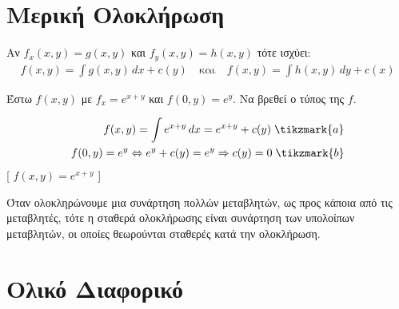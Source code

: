 
\section{Μερική Ολοκλήρωση}

\begin{rem}
\item {}
  Αν $ f_{x}(x,y) = g(x,y)$ και $ f_{y}(x,y)=h(x,y) $ τότε ισχύει:
  \begin{align*}
    f(x,y) = \int g(x,y) \,{dx} + c(y) \quad \text{και} \quad f(x,y) = 
    \int h(x,y) \,{dy} + c(x) 
  \end{align*} 
\end{rem}

\begin{example}
\item {}
  Έστω $ f(x,y)$ με $ f_{x}=e^{x+y} $ και $ f(0,y)=e^{y} $. 
  Να βρεθεί ο τύπος της $f$.
  \begin{solution}
    \begin{align*}
      f(x,y) = \int e^{x+y} \,{dx} = e^{x+y} + c(y) \; \tikzmark{a} \\ 
      f(0,y) = e^{y} \Leftrightarrow e^{y}+ c(y) = e^{y} \Rightarrow c(y) = 0 
      \; \tikzmark{b}
    \end{align*}
    [ $f(x,y) = e^{x+y}$ ]
  \end{solution}
\end{example}

\begin{rem}
  Όταν ολοκληρώνουμε μια συνάρτηση πολλών μεταβλητών, ως προς κάποια από τις 
  μεταβλητές, τότε η σταθερά ολοκλήρωσης είναι \textcolor{Col1}{συνάρτηση} 
  των υπολοίπων μεταβλητών, οι οποίες θεωρούνται σταθερές κατά την ολοκλήρωση.
\end{rem}

\section{Ολικό Διαφορικό}


